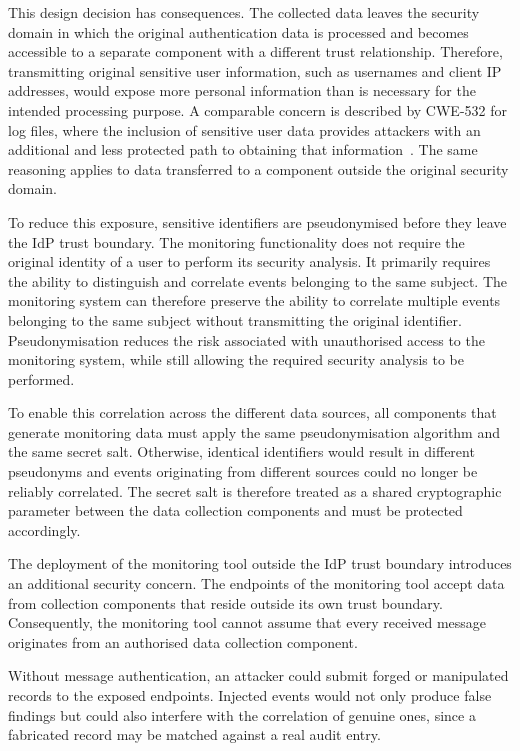 \documentclass[../main.tex]{subfiles}
\begin{document}
This design decision has consequences. 
The collected data leaves the security domain in which the original authentication 
data is processed and becomes accessible to a separate component with a different trust 
relationship. 
Therefore, transmitting original sensitive user information, such as usernames and client IP addresses, 
would expose more personal information than is necessary for the intended processing purpose. 
A comparable concern is described by CWE-532 for log files, where the inclusion of sensitive user data 
provides attackers with an additional and less protected path to obtaining that information~\cite{CWE532}. 
The same reasoning applies to data transferred to a component outside the original security domain.

To reduce this exposure, sensitive identifiers are pseudonymised before they leave the IdP trust boundary. 
The monitoring functionality does not require the original identity of a user to perform its security analysis. 
It primarily requires the ability to distinguish and correlate events belonging to the same subject. 
The monitoring system can therefore preserve the ability to correlate multiple events belonging to the same 
subject without transmitting the original identifier. 
Pseudonymisation reduces the risk associated with unauthorised access to the monitoring system, while still 
allowing the required security analysis to be performed. 

To enable this correlation across the different data sources, all components that generate monitoring data 
must apply the same pseudonymisation algorithm and the same secret salt. 
Otherwise, identical identifiers would result in different pseudonyms and events originating from different 
sources could no longer be reliably correlated. 
The secret salt is therefore treated as a shared cryptographic parameter between the data collection components 
and must be protected accordingly. 

The deployment of the monitoring tool outside the IdP trust boundary introduces an additional security concern. 
The endpoints of the monitoring tool accept data from collection components that reside outside its own 
trust boundary. 
Consequently, the monitoring tool cannot assume that every received message originates from an authorised data 
collection component.

Without message authentication, an attacker could submit forged or manipulated records to the exposed endpoints. 
Injected events would not only produce false findings but could also interfere with the correlation of genuine 
ones, since a fabricated record may be matched against a real audit entry.
\end{document}
